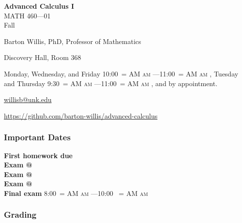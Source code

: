 \documentclass[12pt]{article}
\makeatletter
\newcommand*{\rom}[1]{\expandafter\@slowromancap\romannumeral #1@}
\newcounter{ex}\setcounter{ex}{0}
\newenvironment{mypar}[2]
  {\begin{list}{}%
    {\setlength\leftmargin{#1}
    \setlength\rightmargin{#2}}
    \item[]}
  {\end{list}}
\renewenvironment{description}[0]{\begin{compactdesc}}{\end{compactdesc}}
\DeclareRobustCommand{\maybefakesc}[1]{%
  \ifnum\pdfstrcmp{\f@series}{\bfdefault}=\z@
    {\fontsize{\dimexpr0.8\dimexpr\f@size pt\relax}{0}\selectfont\uppercase{#1}}%
  \else
    \textsc{#1}%
  \fi
}
\newcommand\AM{\,\maybefakesc{am}\xspace}
\newcommand{\coursename}{Advanced Calculus I}
\newcommand{\coursenumber}{MATH 460}
\newcommand{\sectionnumber}{01}
\newcommand{\term}{Fall }
\newcommand{\officehours}{ Monday, Wednesday, and Friday 10:00\AM---11:00\AM,
    Tuesday and Thursday 9:30\AM---11:00\AM, and by appointment.}
\newcommand{\finaldateandtime}{\printdate{13/12/\the\year} 8:00\AM{}---10:00 \AM}
\makeatother
\begin{document}
\cleanlookdateon%
\shortdate
\printyearoff
\large
\begin{center}
    \textbf{\coursename}  \\
    {\coursenumber---\sectionnumber} \\
     {\term \the\year} \\
\end{center}

\vskip0.25in
\normalsize


\begin{center}
\begin{description}
    \item[Instructor:] Barton Willis, PhD, Professor of Mathematics
    \item[Office:]  Discovery Hall, Room 368
    \item[Office Hours:] \officehours
    \item[\phone:]  
    \item[\Email:]  \href{mailto:willisb@unk.edu}{willisb@unk.edu}
    \item[\faGithub]   \url{https://github.com/barton-willis/advanced-calculus}

  \end{description}
\end{center}



\subsubsection*{Important Dates}

\begin{mypar}{0.25in}{0.25in} 

  \textbf{First homework due} \dotfill  {}  \\
  \textbf{Exam \rom{1}} \dotfill {}  \\
  \textbf{Exam \rom{2}} \dotfill  {} \\
  \textbf{Exam \rom{3}} \dotfill {} \\
  \textbf{Final exam} \dotfill  \finaldateandtime
\end{mypar}

\subsubsection*{Grading}
\end{document}
